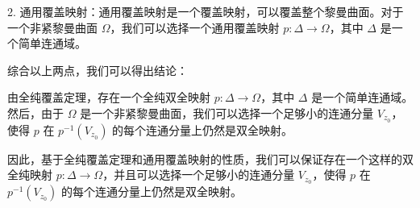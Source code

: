 2. 通用覆盖映射：通用覆盖映射是一个覆盖映射，可以覆盖整个黎曼曲面。对于一个非紧黎曼曲面 \( \Omega \)，我们可以选择一个通用覆盖映射 \( p: \Delta \to \Omega \)，其中 \( \Delta \) 是一个简单连通域。

综合以上两点，我们可以得出结论：

由全纯覆盖定理，存在一个全纯双全映射 \( p: \Delta \to \Omega \)，其中 \( \Delta \) 是一个简单连通域。然后，由于 \( \Omega \) 是一个非紧黎曼曲面，我们可以选择一个足够小的连通分量 \( V_{z_{0}} \)，使得 \( p \) 在 \( p^{-1}(V_{z_{0}}) \) 的每个连通分量上仍然是双全映射。

因此，基于全纯覆盖定理和通用覆盖映射的性质，我们可以保证存在一个这样的双全纯映射 \( p: \Delta \to \Omega \)，并且可以选择一个足够小的连通分量 \( V_{z_{0}} \)，使得 \( p \) 在 \( p^{-1}(V_{z_{0}}) \) 的每个连通分量上仍然是双全映射。


